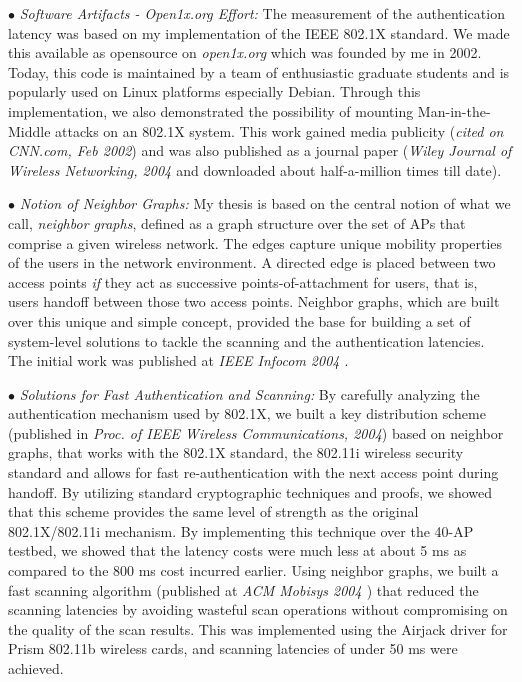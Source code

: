 \documentclass[11pt,letterpaper]{article}
\begin{document}
$\bullet$ {\it Software Artifacts - Open1x.org Effort:} The measurement of the authentication latency was based on my
implementation of the IEEE 802.1X standard.  We made this available as opensource on {\it open1x.org} which was founded
by me in 2002. Today, this code is maintained by a team of enthusiastic  graduate students and is popularly used on Linux
platforms especially Debian. Through this implementation, we also demonstrated the possibility of mounting
Man-in-the-Middle attacks on an 802.1X system. This work gained media publicity ({\it cited on CNN.com, Feb 2002}) and
was also published as a journal paper ({\it Wiley Journal of Wireless Networking, 2004 \cite{security2004}} and downloaded about half-a-million times till date). 
  
$\bullet$ {\it Notion of Neighbor Graphs:} My thesis is based on the central notion of what we call, {\it
neighbor graphs}, defined as a graph structure over the set of APs that comprise a given wireless
network. The edges capture unique mobility properties of the users in the network environment. A directed edge is placed
between two access points {\it if} they act as successive points-of-attachment for users, that is, users handoff between
those two access points. Neighbor graphs, which are built over this unique and simple concept, provided the base for
building a set of system-level solutions to tackle the scanning and the authentication latencies. The initial work was
published at {\it IEEE Infocom 2004 \cite{mishra2004}}.

$\bullet$  {\it Solutions for Fast Authentication and Scanning:} By carefully analyzing the authentication
mechanism used by 802.1X, we built a key distribution scheme (published in {\it Proc. of IEEE Wireless Communications,
2004}) based on neighbor graphs, that works with the 802.1X
standard, the 802.11i wireless security standard and allows for fast re-authentication with the next access point
during handoff. By utilizing standard cryptographic techniques and proofs, we showed that this scheme provides the same
level of strength as the original 802.1X/802.11i mechanism. By implementing this technique over the 40-AP testbed, we 
showed that the latency costs were much less at about 5 ms as compared to the 800 ms cost incurred earlier.  
Using neighbor graphs, we built a fast scanning algorithm (published at {\it ACM Mobisys
2004 \cite{shin2004}}) that reduced the scanning latencies by avoiding wasteful scan operations without compromising on the quality of
the scan results. This was implemented using the Airjack driver for Prism  802.11b wireless cards, and scanning
latencies of under 50 ms were achieved. 
\end{document}

